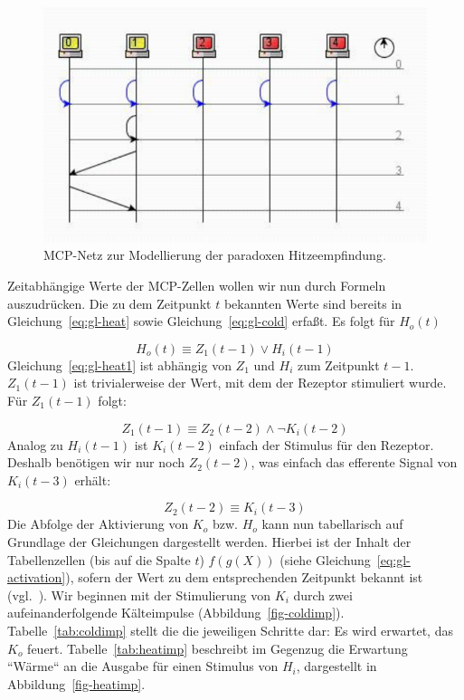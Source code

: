 \begin{figure}[h]
    \centering
    \includegraphics{images/p1ReadSeq.pdf}
    \caption{MCP-Netz zur Modellierung der paradoxen Hitzeempfindung.}
    \label{fig-mcpheat}
\end{figure}

\noindent
Zeitabhängige Werte der MCP-Zellen wollen wir nun durch Formeln auszudrücken.
Die zu dem Zeitpunkt $t$ bekannten Werte sind bereits in Gleichung~\ref{eq:gl-heat} sowie Gleichung~\ref{eq:gl-cold} erfaßt.
\noindent
Es folgt für $H_o(t)$

\begin{equation}
    H_o(t) \equiv Z_1(t-1) \lor H_i(t-1)
    \label{eq:gl-heat1}
\end{equation}
\noindent
Gleichung~\ref{eq:gl-heat1} ist abhängig von $Z_1$ und $H_i$ zum Zeitpunkt $t - 1$. $Z_1(t-1)$ ist trivialerweise der Wert, mit dem der Rezeptor stimuliert wurde. Für $Z_1(t-1)$ folgt:

\begin{equation}
    Z_1(t - 1) \equiv Z_2(t-2) \land \neg K_i(t-2)
    \label{eq:gl-z1}
\end{equation}
\noindent
Analog zu $H_i(t - 1)$ ist $K_i(t - 2)$ einfach der Stimulus für den Rezeptor.
Deshalb benötigen wir nur noch $Z_2(t-2)$, was einfach das efferente Signal von $K_i(t-3)$ erhält:

\begin{equation}
    Z_2(t-2) \equiv K_i(t-3)
    \label{eq:gl-z2}
\end{equation}
\noindent
Die Abfolge der Aktivierung von $K_o$ bzw. $H_o$ kann nun tabellarisch auf Grundlage der Gleichungen dargestellt werden.
Hierbei ist der Inhalt der Tabellenzellen (bis auf die Spalte $t$) $f(g(X))$  (siehe Gleichung~\ref{eq:gl-activation}), sofern der Wert zu dem entsprechenden Zeitpunkt bekannt ist (vgl.~\cite[32 f.]{Fau94}).
\noindent
Wir beginnen mit der Stimulierung von $K_i$ durch zwei aufeinanderfolgende Kälteimpulse (Abbildung~\ref{fig-coldimp}). Tabelle~\ref{tab:coldimp} stellt die die jeweiligen Schritte dar: Es wird erwartet, das $K_o$ feuert. Tabelle~\ref{tab:heatimp} beschreibt im Gegenzug die Erwartung ``Wärme`` an die Ausgabe für einen Stimulus von $H_i$, dargestellt in Abbildung~\ref{fig-heatimp}.

